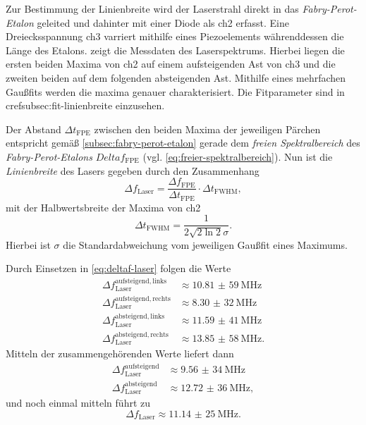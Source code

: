 \documentclass[../bericht.tex]{subfiles}
\begin{document}
        Zur Bestimmung der Linienbreite wird der Laserstrahl direkt in das \textit{Fabry-Perot-Etalon} geleited und dahinter mit einer Diode als ch2 erfasst. Eine Dreiecksspannung ch3 varriert mithilfe eines Piezoelements währenddessen die Länge des Etalons.  zeigt die Messdaten des Laserspektrums. Hierbei liegen die ersten beiden Maxima von ch2 auf einem aufsteigenden Ast von ch3 und die zweiten beiden auf dem folgenden absteigenden Ast. Mithilfe eines mehrfachen Gau\ss{}fits werden die maxima genauer charakterisiert. Die Fitparameter sind in cref{subsec:fit-linienbreite} einzusehen.

        Der Abstand $\Delta t_\mathrm{FPE}$ zwischen den beiden Maxima der jeweiligen P\"archen entspricht gem\"a\ss{} \cref{subsec:fabry-perot-etalon} gerade dem \textit{freien Spektralbereich} des \textit{Fabry-Perot-Etalons} $Delta f_\mathrm{FPE}$ (vgl. \cref{eq:freier-spektralbereich}). Nun ist die \textit{Linienbreite} des Lasers gegeben durch den Zusammenhang
        \begin{equation}
          \Delta f_\mathrm{Laser} = \frac{\Delta f_\mathrm{FPE}}{\Delta t_\mathrm{FPE}}\cdot \Delta t_\mathrm{FWHM},
          \label{eq:deltaf-laser}
        \end{equation}
        mit der Halbwertsbreite der Maxima von ch2
        \begin{equation*}
          \Delta t_\mathrm{FWHM}=\frac{1}{2\sqrt{2\ln 2}\sigma}.
        \end{equation*}
        Hierbei ist $\sigma$ die Standardabweichung vom jeweiligen Gau\ss{}fit eines Maximums.

        Durch Einsetzen in \cref{eq:deltaf-laser} folgen die Werte
        \begin{align*}
          \Delta f_\mathrm{Laser}^\mathrm{aufsteigend, links}&\approx\SI{10,81(59)}{\mega\hertz} \\
          \Delta f_\mathrm{Laser}^\mathrm{aufsteigend, rechts}&\approx\SI{8,30(32)}{\mega\hertz} \\
          \Delta f_\mathrm{Laser}^\mathrm{absteigend, links}&\approx\SI{11,59(41)}{\mega\hertz} \\
          \Delta f_\mathrm{Laser}^\mathrm{absteigend, rechts}&\approx\SI{13,85(58)}{\mega\hertz}.
        \end{align*}
        Mitteln der zusammengeh\"orenden Werte liefert dann
        \begin{align*}
          \Delta f_\mathrm{Laser}^\mathrm{aufsteigend}&\approx\SI{9,56(34)}{\mega\hertz} \\
          \Delta f_\mathrm{Laser}^\mathrm{absteigend}&\approx\SI{12,72(36)}{\mega\hertz} ,
        \end{align*}
        und noch einmal mitteln f\"uhrt zu
        \begin{equation*}
          \Delta f_\mathrm{Laser}\approx\SI{11,14(25)}{\mega\hertz}.
        \end{equation*}
\end{document}
